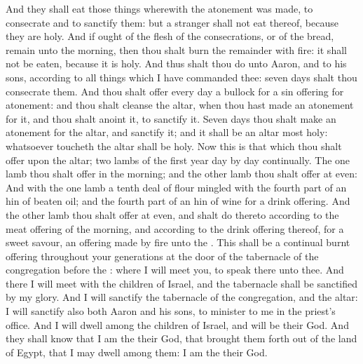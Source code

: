 \begin{biblechapter}
\verse And they shall eat those things wherewith the atonement was made, to consecrate and to sanctify them: but a stranger shall not eat thereof, because they are holy.
\verse And if ought of the flesh of the consecrations, or of the bread, remain unto the morning, then thou shalt burn the remainder with fire: it shall not be eaten, because it is holy.
\verse And thus shalt thou do unto Aaron, and to his sons, according to all things which I have commanded thee: seven days shalt thou consecrate them.
\verse And thou shalt offer every day a bullock for a sin offering for atonement: and thou shalt cleanse the altar, when thou hast made an atonement for it, and thou shalt anoint it, to sanctify it.
\verse Seven days thou shalt make an atonement for the altar, and sanctify it; and it shall be an altar most holy: whatsoever toucheth the altar shall be holy.
\verse Now this is that which thou shalt offer upon the altar; two lambs of the first year day by day continually.
\verse The one lamb thou shalt offer in the morning; and the other lamb thou shalt offer at even:
\verse And with the one lamb a tenth deal of flour mingled with the fourth part of an hin of beaten oil; and the fourth part of an hin of wine for a drink offering.
\verse And the other lamb thou shalt offer at even, and shalt do thereto according to the meat offering of the morning, and according to the drink offering thereof, for a sweet savour, an offering made by fire unto the \LORD.
\verse This shall be a continual burnt offering throughout your generations at the door of the tabernacle of the congregation before the \LORD: where I will meet you, to speak there unto thee.
\verse And there I will meet with the children of Israel, and the tabernacle shall be sanctified by my glory.
\verse And I will sanctify the tabernacle of the congregation, and the altar: I will sanctify also both Aaron and his sons, to minister to me in the priest's office.
\verse And I will dwell among the children of Israel, and will be their God.
\verse And they shall know that I am the \LORD their God, that brought them forth out of the land of Egypt, that I may dwell among them: I am the \LORD their God.
\end{biblechapter}

